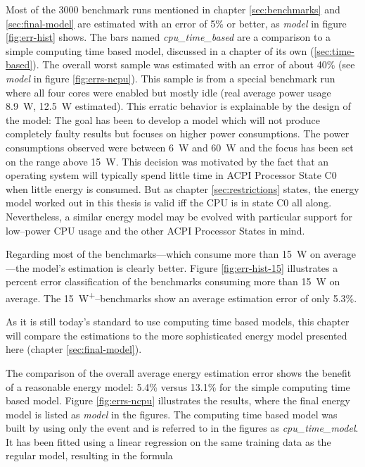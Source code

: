 Most of the 3000 benchmark runs mentioned in chapter \ref{sec:benchmarks} and
\ref{sec:final-model} are estimated with an error of 5\% or better, as
\emph{model} in figure \ref{fig:err-hist} shows. The bars named
\emph{cpu\_\-time\_\-based} are a comparison to a simple computing time based
model, discussed in a chapter of its own (\ref{sec:time-based}). The overall
worst sample was estimated with an error of about 40\% (see \emph{model} in
figure \ref{fig:errs-ncpu}). This sample is from a special benchmark run where
all four cores were enabled but mostly idle (real average power usage
\SI{8.9}{\watt}, \SI{12.5}{\watt} estimated). This erratic behavior is
explainable by the design of the model: The goal has been to develop a model
which will not produce completely faulty results but focuses on higher power
consumptions. The power consumptions observed were between \SI{6}{\watt} and
\SI{60}{\watt} and the focus has been set on the range above \SI{15}{\watt}.
This decision was motivated by the fact that an operating system will typically
spend little time in ACPI Processor State C0 \cite{ACPI} when
little energy is consumed. But as chapter \ref{sec:restrictions} states, the
energy model worked out in this thesis is valid iff the CPU is in state C0
all along.  Nevertheless, a similar energy model may be evolved with
particular support for low--power CPU usage and the other ACPI Processor States
in mind.

Regarding most of the benchmarks---which consume more than
\SI{15}{\watt} on average---the model's estimation is clearly better. Figure
\ref{fig:err-hist-15} illustrates a percent error classification of the
benchmarks consuming more than \SI{15}{\watt} on average. The
\SI{15}{\watt}\textsuperscript{+}--benchmarks show an average estimation error
of only 5.3\%.


\label{sec:time-based}

As it is still today's standard to use computing time based models, this chapter
will compare the estimations to the more sophisticated energy model
presented here (chapter \ref{sec:final-model}).

The comparison of the overall average energy estimation error shows the benefit
of a reasonable energy model: 5.4\% versus 13.1\% for the simple computing time
based model. Figure \ref{fig:errs-ncpu} illustrates the results, where the final
energy model is listed as \emph{model} in the figures. The computing time based
model was built by using only the event  and is
referred to in the figures as \emph{cpu\_\-time\_\-model}. It has been fitted
using a linear regression on the same training data as the regular model,
resulting in the formula

